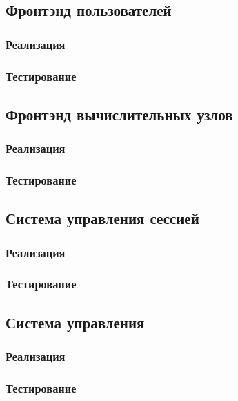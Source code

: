 \documentclass[a4paper,12pt]{report}
\numberwithin{equation}{section}
\begin{document}
  \subsection{Фронтэнд пользователей}
  \subsubsection{Реализация}
  
  \subsubsection{Тестирование}
  
  \subsection{Фронтэнд вычислительных узлов}
  \subsubsection{Реализация}
  
  \subsubsection{Тестирование}
  \subsection{Система управления сессией}
  \subsubsection{Реализация}
  
  \subsubsection{Тестирование}
  
  \subsection{Система управления}
  \subsubsection{Реализация}
  
  \subsubsection{Тестирование}
  
\end{document}
